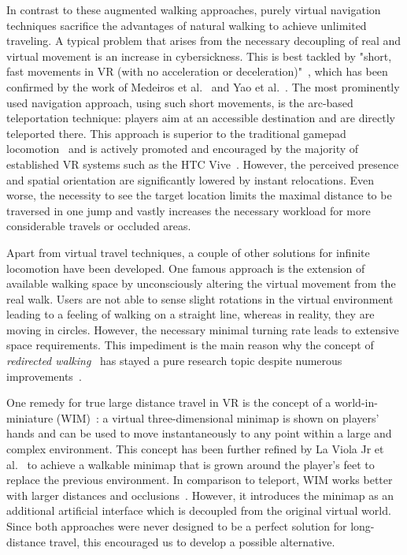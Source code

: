 \documentclass{sigchi}
\newcommand{\comm}[1]{}
\begin{document}
In contrast to these augmented walking approaches, purely virtual navigation techniques sacrifice the advantages of natural walking to achieve unlimited traveling. A typical problem that arises from the necessary decoupling of real and virtual movement is an increase in cybersickness. This is best tackled by "short, fast movements in VR (with no acceleration or deceleration)"~\cite{Habgood:2017:HLP:3130859.3131437}, which has been confirmed by the work of Medeiros et al.~\cite{medeiros2016effects} and Yao et al.~\cite{yao2014oculus}. The most prominently used navigation approach, using such short movements, is the arc-based teleportation technique: players aim at an accessible destination and are directly teleported there. This approach is superior to the traditional gamepad locomotion~\cite{frommel2017effects} and is actively promoted and encouraged by the majority of established VR systems such as the HTC Vive~\cite{vive}. However, the perceived presence and spatial orientation are significantly lowered by instant relocations. Even worse, the necessity to see the target location limits the maximal distance to be traversed in one jump and vastly increases the necessary workload for more considerable travels or occluded areas. \par
Apart from virtual travel techniques, a couple of other solutions for infinite locomotion have been developed. One famous approach is the extension of available walking space by unconsciously altering the virtual movement from the real walk. Users are not able to sense slight rotations in the virtual environment leading to a feeling of walking on a straight line, whereas in reality, they are moving in circles. However, \comm{ the subliminal turning rate must be minimal which leads to a large circle diameter. The required space exceeds living room sizes by an order of magnitude and would only fit into locations like storage halls.} the necessary minimal turning rate leads to extensive space requirements. This impediment is the main reason why the concept of \textit{redirected walking}~\cite{razzaque2005redirected,razzaque2001redirected} has stayed a pure research topic despite numerous improvements~\cite{engel2008psychophysically,Grechkin:2016:RDT:2931002.2931018,langbehn2016subliminal}.\par
One remedy for true large distance travel in VR is the concept of a world-in-miniature (WIM)~\cite{stoakley1995virtual}: a virtual three-dimensional minimap is shown on players' hands and can be used to move instantaneously to any point within a large and complex environment. This concept has been further refined by La Viola Jr et al.~\cite{laviola2001hands} to achieve a walkable minimap that is grown around the player's feet to replace the previous environment. In comparison to teleport, WIM works better with larger distances and occlusions~\cite{berger2018wim}. However, it introduces the minimap as an additional artificial interface which is decoupled from the original virtual world. Since both approaches were never designed to be a perfect solution for long-distance travel, this encouraged us to develop a possible alternative.\par
\end{document}
